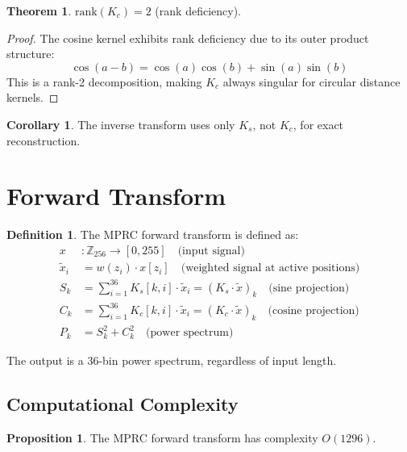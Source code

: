 \documentclass[12pt,a4paper]{article}
\theoremstyle{definition}
\newtheorem{definition}{Definition}
\newtheorem{theorem}{Theorem}
\newtheorem{corollary}{Corollary}
\newtheorem{proposition}{Proposition}
\begin{document}
\begin{theorem}
$\text{rank}(K_c) = 2$ (rank deficiency).
\end{theorem}

\begin{proof}
The cosine kernel exhibits rank deficiency due to its outer product structure:
\[
\cos(a - b) = \cos(a)\cos(b) + \sin(a)\sin(b)
\]
This is a rank-2 decomposition, making $K_c$ always singular for circular distance kernels.
\end{proof}

\begin{corollary}
The inverse transform uses only $K_s$, not $K_c$, for exact reconstruction.
\end{corollary}

\section{Forward Transform}

\begin{definition}
The MPRC forward transform is defined as:
\begin{align}
x &: \mathbb{Z}_{256} \to [0, 255] \quad \text{(input signal)} \\
\tilde{x}_i &= w(z_i) \cdot x[z_i] \quad \text{(weighted signal at active positions)} \\
S_k &= \sum_{i=1}^{36} K_s[k,i] \cdot \tilde{x}_i = (K_s \cdot \tilde{x})_k \quad \text{(sine projection)} \\
C_k &= \sum_{i=1}^{36} K_c[k,i] \cdot \tilde{x}_i = (K_c \cdot \tilde{x})_k \quad \text{(cosine projection)} \\
P_k &= S_k^2 + C_k^2 \quad \text{(power spectrum)}
\end{align}
\end{definition}

The output is a 36-bin power spectrum, regardless of input length.

\subsection{Computational Complexity}

\begin{proposition}
The MPRC forward transform has complexity $O(1296)$.
\end{proposition}
\end{document}
